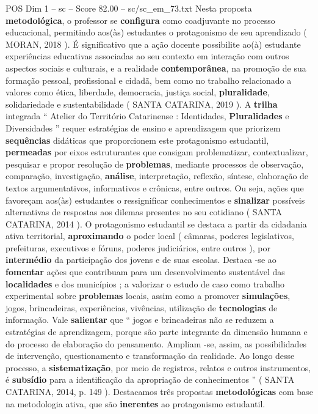 \begin{textsample}{POS Dim 1 – sc – Score 82.00 – sc/sc\_em\_73.txt}
Nesta proposta \textbf{metodológica}, o professor se \textbf{configura} como coadjuvante no processo educacional, permitindo aos(às) estudantes o protagonismo de seu aprendizado ( MORAN, 2018 ).
É significativo que a ação docente possibilite ao(à) estudante experiências educativas associadas ao seu contexto em interação com outros aspectos sociais e culturais, e a realidade \textbf{contemporânea}, na promoção de sua formação pessoal, profissional e cidadã, bem como no trabalho relacionado a valores como ética, liberdade, democracia, justiça social, \textbf{pluralidade}, solidariedade e sustentabilidade ( SANTA CATARINA, 2019 ).
A \textbf{trilha} integrada “ Atelier do Território Catarinense : Identidades, \textbf{Pluralidades} e Diversidades ” requer estratégias de ensino e aprendizagem que priorizem \textbf{sequências} didáticas que proporcionem este protagonismo estudantil, \textbf{permeadas} por eixos estruturantes que consigam problematizar, contextualizar, pesquisar e propor resolução de \textbf{problemas}, mediante processos de observação, comparação, investigação, \textbf{análise}, interpretação, reflexão, síntese, elaboração de textos argumentativos, informativos e crônicas, entre outros.
Ou seja, ações que favoreçam aos(às) estudantes o ressignificar conhecimentos e \textbf{sinalizar} possíveis alternativas de respostas aos dilemas presentes no seu cotidiano ( SANTA CATARINA, 2014 ).
O protagonismo estudantil se destaca a partir da cidadania ativa territorial, \textbf{aproximando} o poder local ( câmaras, poderes legislativos, prefeituras, executivos e fóruns, poderes judiciários, entre outros ), por \textbf{intermédio} da participação dos jovens e de suas escolas.
Destaca -se ao \textbf{fomentar} ações que contribuam para um desenvolvimento sustentável das \textbf{localidades} e dos municípios ; a valorizar o estudo de caso como trabalho experimental sobre \textbf{problemas} locais, assim como a promover \textbf{simulações}, jogos, brincadeiras, experiências, vivências, utilização de \textbf{tecnologias} de informação.
Vale \textbf{salientar} que “ jogos e brincadeiras não se reduzem a estratégias de aprendizagem, porque são parte integrante da dimensão humana e do processo de elaboração do pensamento.
Ampliam -se, assim, as possibilidades de intervenção, questionamento e transformação da realidade.
Ao longo desse processo, a \textbf{sistematização}, por meio de registros, relatos e outros instrumentos, é \textbf{subsídio} para a identificação da apropriação de conhecimentos ” ( SANTA CATARINA, 2014, p. 149 ).
Destacamos três propostas \textbf{metodológicas} com base na metodologia ativa, que são \textbf{inerentes} ao protagonismo estudantil.

\end{textsample}
